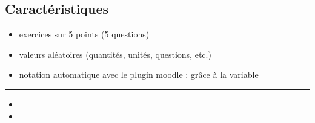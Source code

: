 \documentclass[letterpaper,10pt,french]{sphinxmanual}
\begin{document}
\subsection{Caractéristiques}
\label{\detokenize{sciences-energie:caracteristiques}}\begin{itemize}
\item {} 
exercices sur 5 points (5 questions)

\item {} 
valeurs aléatoires (quantités, unités, questions, etc.)

\item {} 
notation automatique avec le plugin moodle : grâce à la variable 

\end{itemize}


\bigskip\hrule\bigskip

\begin{itemize}
\item {} 

\item {} 

\end{itemize}



\renewcommand{\indexname}{Index}
\printindex
\end{document}
